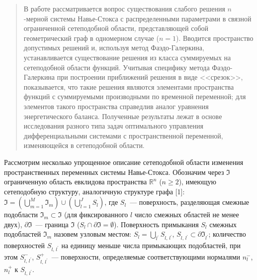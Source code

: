 \maketitle

\begin{abstract}
В работе рассматривается вопрос существования слабого решения $n$-мерной  системы Навье-Стокса с распределенными параметрами в связной ограниченной сетеподобной области, представляющей собой геометрический граф в одномерном случае ($n=1$). Вводится пространство допустимых решений и, используя метод Фаэдо-Галеркина, устанавливается существование решения из класса суммируемых на сетеподобной области функций. Учитывая специфику метода Фаэдо-Галеркина при построении приближений решения в виде <<срезок>>, показывается, что такие решения являются элементами пространства функций с суммируемыми производными по временной переменной; для элементов такого пространства справедлив аналог уравнения энергетического баланса.  Полученные результаты лежат в основе исследования разного типа задач оптимального управления дифференциальными системами с пространственной переменной, изменяющейся  в сетеподобной области.

\end{abstract}



Рассмотрим несколько упрощенное описание сетеподобной области изменения пространственных переменных системы Навье-Стокса. Обозначим через $\Im$ ограниченную область евклидова пространства $\mathbb{R}^n$ ($n\geq2$), имеющую сетеподобную структуру, аналогичную структуре графа [1]: $\Im=\left(\bigcup\limits_{m=1}^M\Im_m\right)\cup\left(\bigcup\limits_{l=1}^JS_l\right)$, где  $S_l$~---  поверхность, разделяющая смежные подобласти $\Im_m\subset\Im$ (для фиксированного $l$ число смежных областей не менее двух), $\partial\Im$~--- граница  $\Im$ ($S_l\cap\partial\Im=\emptyset$). Поверхность  примыкания $S_l$ смежных подобластей $\Im_m$ назовем узловым местом: $S_l=\bigcup\limits_{l^\prime} S_{l,\,l^\prime}$, $S_{l,\,l^\prime}\subset \partial \Im_{l^\prime}$; количество поверхностей $S_{l,\,l^\prime}$  на единицу меньше числа примыкающих подобластей, при этом $S^-_{l,\,l^\prime}$, $S^+_{l,\,l^\prime}$~--- поверхности, определяемые соответствующими нормалями $n^-_l$, $n^+_l$ к $S_{l,\,l^\prime}$.


